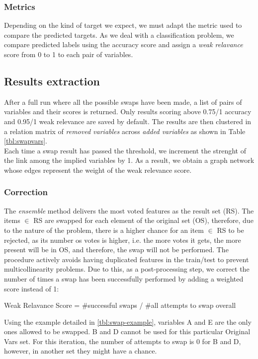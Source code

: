 \subsubsection{Metrics}
Depending on the kind of target we expect, we must adapt the metric used to compare the predicted targets. As we deal with a classification problem, we compare predicted labels using the accuracy score and assign a \textit{weak relavance} score from 0 to 1 to each pair of variables.

\subsection{Results extraction}
After a full run where all the possible swaps have been made, a list of pairs of variables and their scores is returned. Only results scoring above 0.75/1 accuracy and 0.95/1 weak relevance are saved by default. The results are then clustered in a relation matrix of \textit{removed variables} across \textit{added variables} as shown in Table \ref{tbl:swapvars}. 
\\

Each time a swap result has passed the threshold, we increment the strenght of the link among the implied variables by 1. As a result, we obtain a graph network whose edges represent the weight of the weak relevance score.

\subsubsection{Correction}
The \emph{ensemble} method delivers the most voted features as the result set (RS). The items $\in$ RS are swapped for each element of the original set (OS), therefore, due to the nature of the problem, there is a higher chance for an item $\in$ RS to be rejected, as its number os votes is higher, i.e. the more votes it gets, the more present will be in OS, and therefore, the swap will not be performed. The procedure actively avoids having duplicated features in the train/test to prevent multicollinearity problems. Due to this, as a post-processing step, we correct the number of times a swap has been successfully performed by adding a weighted score instead of 1:

\begin{center}
    Weak Relavance Score = \#successful swaps / \#all attempts to swap overall
\end{center}

Using the example detailed in \ref{tbl:swap-example}, variables A and E are the only ones allowed to be swapped. B and D cannot be used for this particular Original Vars set. For this iteration, the number of attempts to swap is 0 for B and D, however, in another set they might have a chance.
\\

